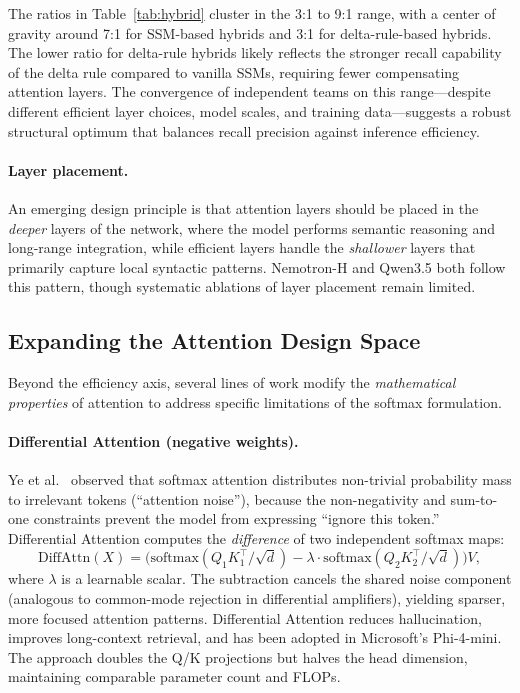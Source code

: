 \documentclass[11pt,a4paper]{article}
\begin{document}
The ratios in Table~\ref{tab:hybrid} cluster in the 3:1 to 9:1 range, with a center of gravity around 7:1 for SSM-based hybrids and 3:1 for delta-rule-based hybrids. The lower ratio for delta-rule hybrids likely reflects the stronger recall capability of the delta rule compared to vanilla SSMs, requiring fewer compensating attention layers. The convergence of independent teams on this range---despite different efficient layer choices, model scales, and training data---suggests a robust structural optimum that balances recall precision against inference efficiency.

\paragraph{Layer placement.}
An emerging design principle is that attention layers should be placed in the \emph{deeper} layers of the network, where the model performs semantic reasoning and long-range integration, while efficient layers handle the \emph{shallower} layers that primarily capture local syntactic patterns. Nemotron-H and Qwen3.5 both follow this pattern, though systematic ablations of layer placement remain limited.


\subsection{Expanding the Attention Design Space}
\label{subsec:attn-variants}

Beyond the efficiency axis, several lines of work modify the \emph{mathematical properties} of attention to address specific limitations of the softmax formulation.

\paragraph{Differential Attention (negative weights).}
Ye et al.~\cite{ye2024differential} observed that softmax attention distributes non-trivial probability mass to irrelevant tokens (``attention noise''), because the non-negativity and sum-to-one constraints prevent the model from expressing ``ignore this token.'' Differential Attention computes the \emph{difference} of two independent softmax maps:
\begin{equation}
\text{DiffAttn}(X) = \bigl(\text{softmax}(Q_1 K_1^\top / \sqrt{d}) - \lambda \cdot \text{softmax}(Q_2 K_2^\top / \sqrt{d})\bigr) V,
\end{equation}
where $\lambda$ is a learnable scalar. The subtraction cancels the shared noise component (analogous to common-mode rejection in differential amplifiers), yielding sparser, more focused attention patterns. Differential Attention reduces hallucination, improves long-context retrieval, and has been adopted in Microsoft's Phi-4-mini. The approach doubles the Q/K projections but halves the head dimension, maintaining comparable parameter count and FLOPs.
\end{document}
